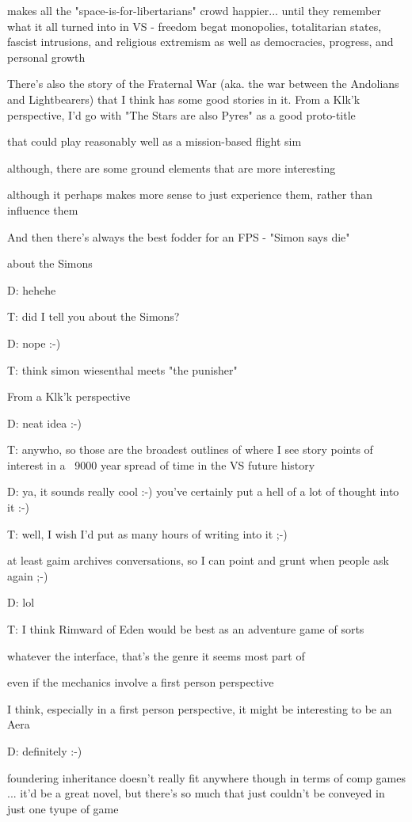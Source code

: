 makes all the "space-is-for-libertarians" crowd happier... until they remember what it all turned into in VS - freedom begat monopolies, totalitarian states, fascist intrusions, and religious extremism as well as democracies, progress, and personal growth

There's also the story of the Fraternal War (aka. the war between the Andolians and Lightbearers) that I think has some good stories in it. From a Klk'k perspective, I'd go with "The Stars are also Pyres" as a good proto-title

that could play reasonably well as a mission-based flight sim

although, there are some ground elements that are more interesting

although it perhaps makes more sense to just experience them, rather than influence them

And then there's always the best fodder for an FPS - "Simon says die"

about the Simons

D: hehehe

T: did I tell you about the Simons?

D: nope :-)

T: think simon wiesenthal meets "the punisher"

From a Klk'k perspective

D: neat idea :-)

T: anywho, so those are the broadest outlines of where I see story points of interest in a ~9000 year spread of time in the VS future history

D: ya, it sounds really cool :-) you've certainly put a hell of a lot of thought into it :-)

T: well, I wish I'd put as many hours of writing into it ;-)

at least gaim archives conversations, so I can point and grunt when people ask again ;-)

D: lol

T: I think Rimward of Eden would be best as an adventure game of sorts

whatever the interface, that's the genre it seems most part of

even if the mechanics involve a first person perspective

I think, especially in a first person perspective, it might be interesting to be an Aera

D: definitely :-)

foundering inheritance doesn't really fit anywhere though in terms of comp games ... it'd be a great novel, but there's so much that just couldn't be conveyed in just one tyupe of game

